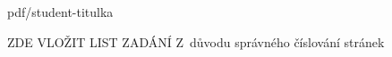 \documentclass[%
  12pt,       				%
  a4paper,    				%
	pdftex,							%
czech              %
]{report}				    	%
\begin{document}
\setcounter{page}{2} %

%
  {pdf/student-titulka}%

%

\stranka{}%
{\sffamily\Huge\centering ZDE VLOŽIT LIST ZADÁNÍ}%
{\sffamily\centering Z~důvodu správného číslování stránek}


\vytvorprohlaseni
\vytvorabstrakt
\vytvorpodekovani


\obsah




\seznamobrazku
\seznamtabulek


\prilohy
\seznampriloh


\end{document}
